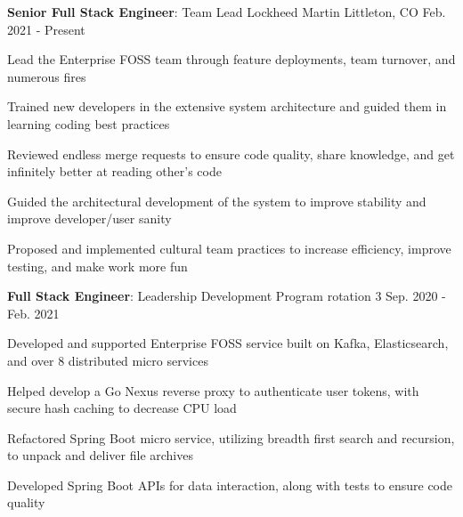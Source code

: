 


\begin{cventries}

    \vspace{-.25em}
    \cventry
    {\textbf{Senior Full Stack Engineer}: Team Lead} %
    {Lockheed Martin} %
    {Littleton, CO} %
    {Feb. 2021 - Present} %
    { %
        \begin{cvitems}
            \item {Lead the Enterprise FOSS team through feature deployments, team turnover, and numerous fires}
            \item {Trained new developers in the extensive system architecture and guided them in learning coding best practices}
            \item {Reviewed endless merge requests to ensure code quality, share knowledge, and get infinitely better at reading other's code}
            \item {Guided the architectural development of the system to improve stability and improve developer/user sanity}
            \item {Proposed and implemented cultural team practices to increase efficiency, improve testing, and make work more fun}
        \end{cvitems}
    }

    \vspace{-1.25em}
    \cventry
    {\textbf{Full Stack Engineer}: Leadership Development Program rotation 3} %
    {} %
    {} %
    {Sep. 2020 - Feb. 2021} %
    { %
        \begin{cvitems}
            \item {Developed and supported Enterprise FOSS service built on Kafka, Elasticsearch, and over 8 distributed micro services}
            \item {Helped develop a Go Nexus reverse proxy to authenticate user tokens, with secure hash caching to decrease CPU load}
            \item {Refactored Spring Boot micro service, utilizing breadth first search and recursion, to unpack and deliver file archives}
            \item {Developed Spring Boot APIs for data interaction, along with tests to ensure code quality}
        \end{cvitems}
    }


\end{cventries}
